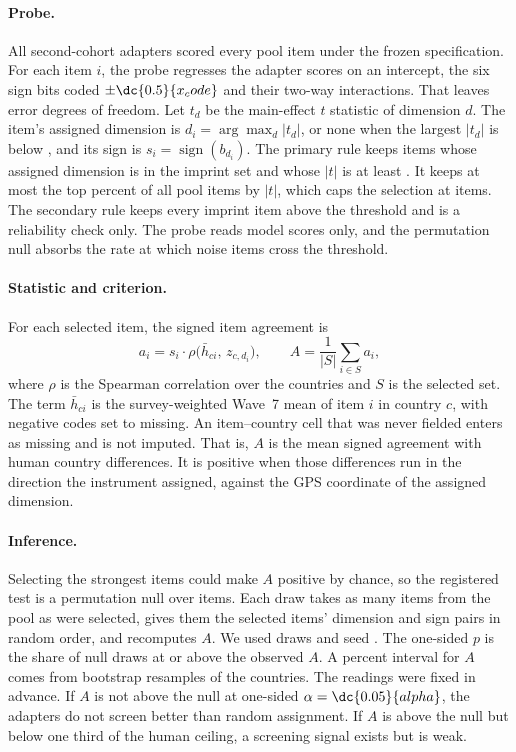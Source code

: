 \paragraph{Probe.} All  second-cohort adapters scored every pool item under the frozen specification. For each item $i$, the probe regresses the  adapter scores on an intercept, the six sign bits coded $\pm\dc{0.5}{x_code}$ and their  two-way interactions. That leaves  error degrees of freedom. Let $t_{d}$ be the main-effect $t$ statistic of dimension $d$. The item's assigned dimension is $d_i=\arg\max_d|t_d|$, or none when the largest $|t_d|$ is below , and its sign is $s_i=\operatorname{sign}(b_{d_i})$. The primary rule keeps items whose assigned dimension is in the imprint set and whose $|t|$ is at least . It keeps at most the top  percent of all pool items by $|t|$, which caps the selection at  items. The secondary rule keeps every imprint item above the threshold and is a reliability check only. The probe reads model scores only, and the permutation null absorbs the rate at which noise items cross the threshold.

\paragraph{Statistic and criterion.} For each selected item, the signed item agreement is
\begin{equation}
a_i = s_i\cdot\rho\big(\bar h_{ci},\,z_{c,d_i}\big),
\qquad
A=\frac{1}{|S|}\sum_{i\in S}a_i,
\label{eq:screen}
\end{equation}
where $\rho$ is the Spearman correlation over the  countries and $S$ is the selected set. The term $\bar h_{ci}$ is the survey-weighted Wave~7 mean of item $i$ in country $c$, with negative codes set to missing. An item--country cell that was never fielded enters as missing and is not imputed. That is, $A$ is the mean signed agreement with human country differences. It is positive when those differences run in the direction the instrument assigned, against the GPS coordinate of the assigned dimension.

\paragraph{Inference.} Selecting the strongest items could make $A$ positive by chance, so the registered test is a permutation null over items. Each draw takes as many items from the pool as were selected, gives them the selected items' dimension and sign pairs in random order, and recomputes $A$. We used  draws and seed . The one-sided $p$ is the share of null draws at or above the observed $A$. A  percent interval for $A$ comes from  bootstrap resamples of the  countries. The readings were fixed in advance. If $A$ is not above the null at one-sided $\alpha=\dc{0.05}{alpha}$, the adapters do not screen better than random assignment. If $A$ is above the null but below one third of the human ceiling, a screening signal exists but is weak.

